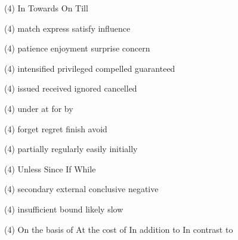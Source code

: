 \item
\begin{tasks}(4)
	\task In
	\task Towards
	\task On
	\task Till
\end{tasks}
\item
\begin{tasks}(4)
	\task match
	\task express
	\task satisfy
	\task influence
\end{tasks}
\item
\begin{tasks}(4)
	\task patience
	\task enjoyment
	\task surprise
	\task concern
\end{tasks}
\item
\begin{tasks}(4)
	\task intensified
	\task privileged
	\task compelled
	\task guaranteed
\end{tasks}
\item
\begin{tasks}(4)
	\task issued
	\task received
	\task ignored
	\task cancelled
\end{tasks}
\item
\begin{tasks}(4)
	\task under
	\task at
	\task for
	\task by
\end{tasks}
\item
\begin{tasks}(4)
	\task forget
	\task regret
	\task finish
	\task avoid
\end{tasks}
\item
\begin{tasks}(4)
	\task partially
	\task regularly
	\task easily
	\task initially
\end{tasks}
\item
\begin{tasks}(4)
	\task Unless
	\task Since
	\task If
	\task While
\end{tasks}
\item
\begin{tasks}(4)
	\task secondary
	\task external
	\task conclusive
	\task negative
\end{tasks}
\item
\begin{tasks}(4)
	\task insufficient
	\task bound
	\task likely
	\task slow
\end{tasks}
\item
\begin{tasks}(4)
	\task On the basis of
	\task At the cost of
	\task In addition to
	\task In contrast to
\end{tasks}
\item

